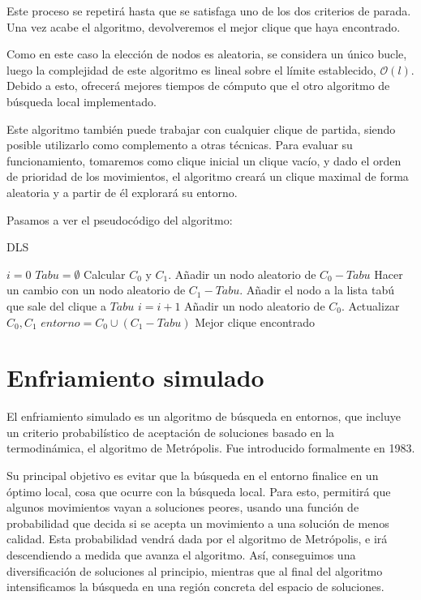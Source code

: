 Este proceso se repetirá hasta que se satisfaga uno de los dos criterios de parada. Una vez
acabe el algoritmo, devolveremos el mejor clique que haya encontrado.

Como en este caso la elección de nodos es aleatoria, se considera un único bucle,
luego la complejidad de este algoritmo es lineal sobre el límite establecido,
$\mathcal{O}(l)$. Debido a esto, ofrecerá mejores tiempos de cómputo que el otro
algoritmo de búsqueda local implementado.

Este algoritmo también puede trabajar con cualquier clique de partida, siendo posible
utilizarlo como complemento a otras técnicas. Para evaluar su funcionamiento, tomaremos
como clique inicial un clique vacío, y dado el orden de prioridad de los movimientos,
el algoritmo creará un clique maximal de forma aleatoria y a partir de él explorará
su entorno.

Pasamos a ver el pseudocódigo del algoritmo:

\begin{algorithm}[H]
\caption{DLS}
  \begin{algorithmic}
    \State $i = 0$
    \State $Tabu = \emptyset$
    \State Calcular $C_0$ y $C_1$.
    \Repeat
        \State Añadir un nodo aleatorio de $C_0 - Tabu$
        \State Hacer un cambio con un nodo aleatorio de $C_1 - Tabu$.
        \State Añadir el nodo a la lista tabú que sale del clique a $Tabu$
        \State $i = i + 1$
        \State Añadir un nodo aleatorio de $C_0$.
      \EndIf
      \State Actualizar $C_0, C_1$
      \State $entorno = C_0 \cup (C_1 - Tabu)$
    \Return Mejor clique encontrado
    \EndFunction
  \end{algorithmic}
\end{algorithm}

\section{Enfriamiento simulado}\label{enfriamiento}

El enfriamiento simulado es un algoritmo de búsqueda en entornos, que incluye un
criterio probabilístico de aceptación de soluciones basado en la termodinámica,
el algoritmo de Metrópolis. Fue introducido formalmente en 1983.

Su principal objetivo es evitar que la búsqueda en el entorno finalice en un óptimo
local, cosa que ocurre con la búsqueda local. Para esto, permitirá que algunos
movimientos vayan a soluciones peores, usando una función de probabilidad que decida
si se acepta un movimiento a una solución de menos calidad. Esta probabilidad vendrá
dada por el algoritmo de Metrópolis, e irá descendiendo a medida que avanza el algoritmo.
Así, conseguimos una diversificación de soluciones al principio, mientras que al final
del algoritmo intensificamos la búsqueda en una región concreta del espacio de soluciones.

